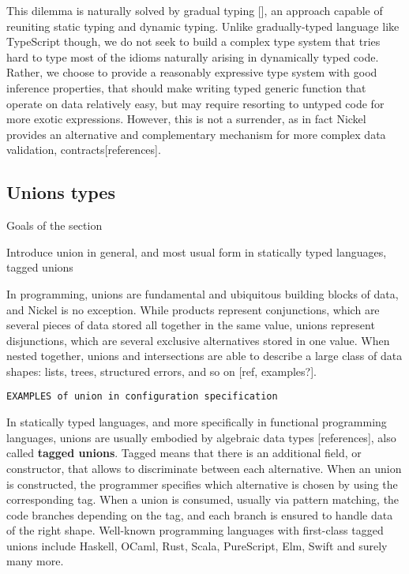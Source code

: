 \documentclass{article}
\begin{document}
This dilemma is naturally solved by gradual typing [], an approach capable of
reuniting static typing and dynamic typing. Unlike gradually-typed language like
TypeScript though, we do not seek to build a complex type system that tries hard
to type most of the idioms naturally arising in dynamically typed code.  Rather,
we choose to provide a reasonably expressive type system with good inference
properties, that should make writing typed generic function that operate on data
relatively easy, but may require resorting to untyped code for more exotic expressions.
However, this is not a surrender, as in fact Nickel provides an alternative and
complementary mechanism for more complex data validation, contracts[references].

\subsection{Unions types}
\color{red}Goals of the section

Introduce union in general, and most usual form in statically typed languages, tagged unions\vspace{0.5cm}\color{black}

In programming, unions are fundamental and ubiquitous building blocks of data,
and Nickel is no exception. While products represent conjunctions, which are several pieces of
data stored all together in the same value, unions represent disjunctions, which are
several exclusive alternatives stored in one value. When nested together, unions
and intersections are able to describe a large class of data shapes: lists,
trees, structured errors, and so on [ref, examples?].

\begin{verbatim}
EXAMPLES of union in configuration specification
\end{verbatim}

In statically typed languages, and more specifically in functional programming
languages, unions are usually embodied by algebraic data types [references],
also called \textbf{tagged unions}. Tagged means that there is an additional
field, or constructor, that allows to discriminate between each alternative.
When an union is constructed, the programmer specifies which alternative is
chosen by using the corresponding tag. When a union is consumed, usually
via pattern matching, the code branches depending on the tag, and each branch is
ensured to handle data of the right shape. Well-known programming languages with
first-class tagged unions include Haskell, OCaml, Rust, Scala, PureScript, Elm,
Swift and surely many more.
\end{document}
